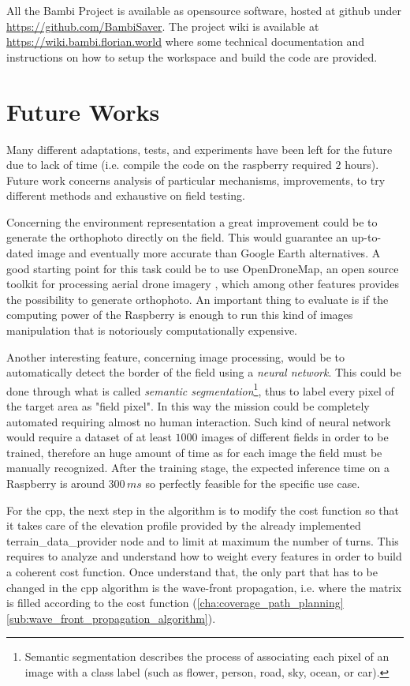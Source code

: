 All the Bambi Project is available as opensource software, hosted at github under \url{https://github.com/BambiSaver}.
The project wiki is available at \url{https://wiki.bambi.florian.world} where some technical documentation and instructions on how to setup the workspace and build the code are provided.

\section{Future Works} %
\label{sec:future_work}
Many different adaptations, tests, and experiments have been left for the future due to lack of time (i.e. compile the code on the raspberry required $2$ hours). Future work concerns analysis of particular mechanisms, improvements, to try different methods and exhaustive on field testing.\par
Concerning the environment representation a great improvement could be to generate the orthophoto directly on the field. This would guarantee an up-to-dated image and eventually more accurate than Google Earth alternatives. A good starting point for this task could be to use \textsf{OpenDroneMap}, an open source toolkit for processing aerial drone imagery \cite{ODM}, which among other features provides the possibility to generate orthophoto. An important thing to evaluate is if the computing power of the Raspberry is enough to run this kind of images manipulation that is notoriously computationally expensive.\par
Another interesting feature, concerning image processing, would be to automatically detect the border of the field using a \textit{neural network}. This could be done through what is called \textit{semantic segmentation}\footnote{ Semantic segmentation describes the process of associating each pixel of an image with a class label (such as flower, person, road, sky, ocean, or car).}, thus to label every pixel of the target area as "field pixel". In this way the mission could be completely automated requiring almost no human interaction. Such kind of neural network would require a dataset of at least $1000$ images of different fields in order to be trained, therefore an huge amount of time as for each image the field must be manually recognized. After the training stage, the expected inference time on a Raspberry is around $300\, ms$ so perfectly feasible for the specific use case.\par
For the \acrfull{cpp}, the next step in the algorithm is to modify the cost function so that it takes care of the elevation profile provided by the already implemented \textsf{terrain\_data\_provider} node and to limit at maximum the number of turns. This requires to analyze and understand how to weight every features in order to build a coherent cost function. Once understand that, the only part that has to be changed in the \acrshort{cpp} algorithm is the wave-front propagation, i.e. where the matrix is filled according to the cost function (\autoref{cha:coverage_path_planning} \autoref{sub:wave_front_propagation_algorithm}).
